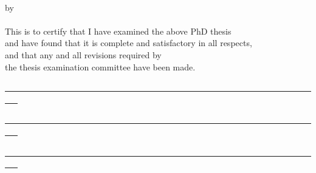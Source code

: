 \begin{center}
{\Large \thesistitle}\\
\vspace{5mm}
by\\
\vspace{3mm}
\thesisauthor\\
\vspace{5mm}
This is to certify that I have examined the above PhD thesis\\
and have found that it is complete and satisfactory in all respects,\\
and that any and all revisions required by\\
the thesis examination committee have been made.
\end{center}

\vspace{15mm}

\begin{center}
\underline{~~~~~~~~~~~~~~~~~~~~~~~~~~~~~~~~~~~~~~~~~~~~~~~~~~~~~~~~~~~~~~~~~~~~~~~~~~~ }\\
\supervisorinfo
\end{center}

\vspace{15mm}
\begin{center}
\underline{~~~~~~~~~~~~~~~~~~~~~~~~~~~~~~~~~~~~~~~~~~~~~~~~~~~~~~~~~~~~~~~~~~~~~~~~~~~ }\\
\cosupervisorinfo
\end{center}

\vspace{15mm}
\begin{center}
\underline{~~~~~~~~~~~~~~~~~~~~~~~~~~~~~~~~~~~~~~~~~~~~~~~~~~~~~~~~~~~~~~~~~~~~~~~~~~~ }\\
\depheadinfo
\end{center}

\vspace{5mm}
\begin{center}
\departmentname\\
\vspace{5mm}
\signdate
\end{center}
